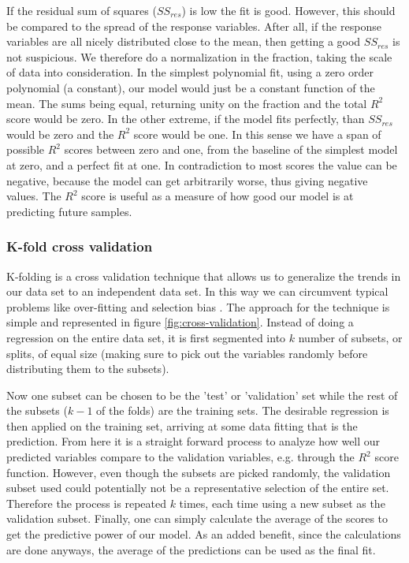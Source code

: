 	If the residual sum of squares ($SS_{res}$) is low the fit is good. However, this should be compared to the spread of the response variables. After all, if the response variables are all nicely distributed close to the mean, then getting a good $SS_{res}$ is not suspicious. We therefore do a normalization in the fraction, taking the scale of data into consideration. In the simplest polynomial fit, using a zero order polynomial (a constant), our model would just be a constant function of the mean. The sums being equal, returning unity on the fraction and the total $R^2$ score would be zero. In the other extreme, if the model fits perfectly, than $SS_{res}$ would be zero and the $R^2$ score would be one. In this sense we have a span of possible $R^2$ scores between zero and one, from the baseline of the simplest model at zero, and a perfect fit at one. In contradiction to most scores the value can be negative, because the model can get arbitrarily worse, thus giving negative values.
	The $R^2$ score is useful as a measure of how good our model is at predicting future samples.
	 
\subsubsection{K-fold cross validation}\label{sec:cross_validation}
	K-folding is a cross validation technique that allows us to generalize the trends in our data set to an independent data set. In this way we can circumvent typical problems like over-fitting and selection bias \cite{james2013introduction}. The approach for the technique is simple and represented in figure \ref{fig:cross-validation}. Instead of doing a regression on the entire data set, it is first segmented into $k$ number of subsets, or splits, of equal size (making sure to pick out the variables randomly before distributing them to the subsets). 
	
	Now one subset can be chosen to be the 'test' or 'validation' set while the rest of the subsets ($k-1$ of the folds) are the training sets. The desirable regression is then applied on the training set, arriving at some data fitting that is the prediction. From here it is a straight forward process to analyze how well our predicted variables compare to the validation variables, e.g. through the $R^2$ score function. However, even though the subsets are picked randomly, the validation subset used could potentially not be a representative selection of the entire set. Therefore the process is repeated $k$ times, each time using a new subset as the validation subset. Finally, one can simply calculate the average of the scores to get the predictive power of our model. As an added benefit, since the calculations are done anyways, the average of the predictions can be used as the final fit. 
	
